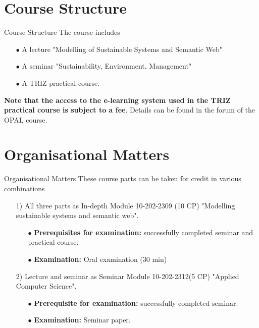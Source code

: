 \documentclass{beamer}
\begin{document}
\section{Course Structure}
\begin{frame}{Course Structure}
The course includes

\begin{itemize}
\item[$\bullet$] A lecture "Modelling of Sustainable Systems and Semantic Web"
\item[$\bullet$] A seminar "Sustainability, Environment, Management"
\item[$\bullet$] A TRIZ practical course.
\end{itemize}
\textbf{Note that the access to the e-learning system used in the TRIZ
  practical course is subject to a fee}. Details can be found in the forum of
the OPAL course.
\end{frame}

\section{Organisational Matters}
\begin{frame}{Organisational Matters}
These course parts can be taken for credit in various combinations

\begin{itemize}
\item[1)] All three parts as In-depth Module 10-202-2309 (10 CP) "Modelling
  sustainable systems and semantic web".
  \begin{itemize}[noitemsep]
  \item[$\bullet$] \textbf{Prerequisites for examination:} successfully
    completed seminar and practical course.
  \item[$\bullet$] \textbf{Examination:} Oral examination (30 min)
  \end{itemize}
\item[2)] Lecture and seminar as Seminar Module 10-202-2312(5 CP) "Applied
  Computer Science".
  \begin{itemize}[noitemsep]
  \item[$\bullet$] \textbf{Prerequisite for examination:} successfully
    completed seminar.
  \item[$\bullet$] \textbf{Examination:} Seminar paper.
  \end{itemize}
\end{itemize}
\end{frame}
\end{document}

